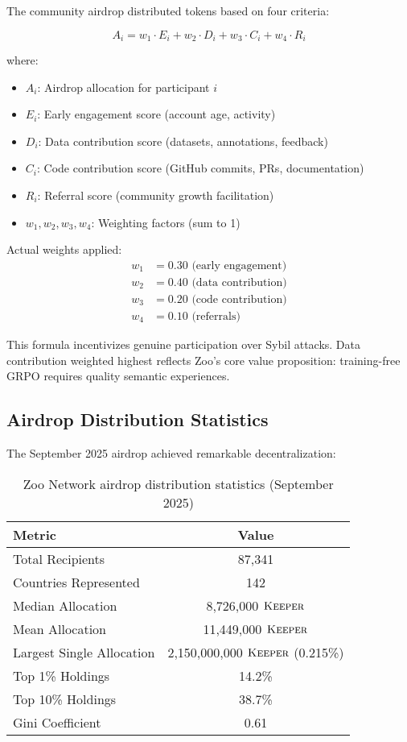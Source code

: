 \documentclass[11pt,letterpaper]{article}
\theoremstyle{definition}
\theoremstyle{remark}
\newcommand{\KEEPER}{\textsc{Keeper}}
\begin{document}
The community airdrop distributed tokens based on four criteria:

\begin{equation}
A_i = w_1 \cdot E_i + w_2 \cdot D_i + w_3 \cdot C_i + w_4 \cdot R_i
\end{equation}

where:
\begin{itemize}
\item $A_i$: Airdrop allocation for participant $i$
\item $E_i$: Early engagement score (account age, activity)
\item $D_i$: Data contribution score (datasets, annotations, feedback)
\item $C_i$: Code contribution score (GitHub commits, PRs, documentation)
\item $R_i$: Referral score (community growth facilitation)
\item $w_1, w_2, w_3, w_4$: Weighting factors (sum to 1)
\end{itemize}

Actual weights applied:
\begin{align}
w_1 &= 0.30 \text{ (early engagement)} \\
w_2 &= 0.40 \text{ (data contribution)} \\
w_3 &= 0.20 \text{ (code contribution)} \\
w_4 &= 0.10 \text{ (referrals)}
\end{align}

This formula incentivizes genuine participation over Sybil attacks. Data contribution weighted highest reflects Zoo's core value proposition: training-free GRPO requires quality semantic experiences.

\subsection{Airdrop Distribution Statistics}

The September 2025 airdrop achieved remarkable decentralization:

\begin{table}[h]
\centering
\begin{tabular}{lc}
\toprule
\textbf{Metric} & \textbf{Value} \\
\midrule
Total Recipients & 87,341 \\
Countries Represented & 142 \\
Median Allocation & 8,726,000 $\KEEPER$ \\
Mean Allocation & 11,449,000 $\KEEPER$ \\
Largest Single Allocation & 2,150,000,000 $\KEEPER$ (0.215\%) \\
Top 1\% Holdings & 14.2\% \\
Top 10\% Holdings & 38.7\% \\
Gini Coefficient & 0.61 \\
\bottomrule
\end{tabular}
\caption{Zoo Network airdrop distribution statistics (September 2025)}
\label{tab:airdrop_stats}
\end{table}
\end{document}
